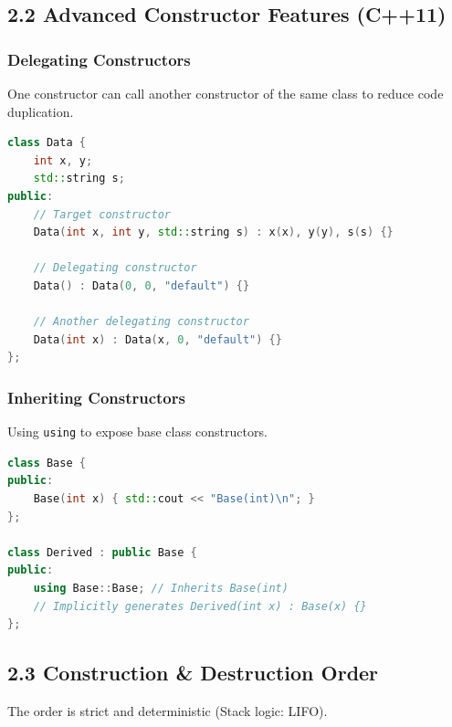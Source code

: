 \hypertarget{advanced-constructor-features-c11}{%
\subsection{2.2 Advanced Constructor Features
(C++11)}\label{advanced-constructor-features-c11}}

\hypertarget{delegating-constructors}{%
\subsubsection{Delegating Constructors}\label{delegating-constructors}}

One constructor can call another constructor of the same class to reduce
code duplication.

\begin{lstlisting}[language={C++}]
class Data {
    int x, y;
    std::string s;
public:
    // Target constructor
    Data(int x, int y, std::string s) : x(x), y(y), s(s) {}
    
    // Delegating constructor
    Data() : Data(0, 0, "default") {} 
    
    // Another delegating constructor
    Data(int x) : Data(x, 0, "default") {}
};
\end{lstlisting}

\hypertarget{inheriting-constructors}{%
\subsubsection{Inheriting Constructors}\label{inheriting-constructors}}

Using \passthrough{\lstinline!using!} to expose base class constructors.

\begin{lstlisting}[language={C++}]
class Base {
public:
    Base(int x) { std::cout << "Base(int)\n"; }
};

class Derived : public Base {
public:
    using Base::Base; // Inherits Base(int)
    // Implicitly generates Derived(int x) : Base(x) {}
};
\end{lstlisting}

\hypertarget{construction-destruction-order}{%
\subsection{2.3 Construction \& Destruction
Order}\label{construction-destruction-order}}

The order is strict and deterministic (Stack logic: LIFO).

